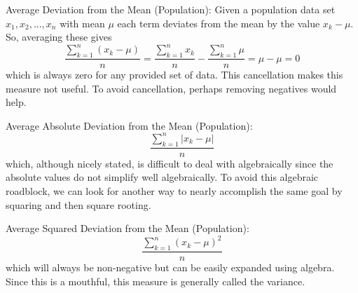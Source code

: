 \documentclass[10pt,]{book}
\theoremstyle{plain}
\theoremstyle{definition}
\theoremstyle{definition}
\theoremstyle{definition}
\numberwithin{equation}{section}
\begin{document}
Average Deviation from the Mean (Population):  Given a population data set \(x_1, x_2, ... , x_n\) with mean \(\mu\) each term deviates from the mean by the value \(x_k - \mu\). So, averaging these gives
\begin{equation*} \frac{\sum_{k=1}^n (x_k-\mu)}{n} = \frac{\sum_{k=1}^n x_k}{n} - \frac{\sum_{k=1}^n \mu}{n} = \mu - \mu = 0\end{equation*}
which is always zero for any provided set of data. This cancellation makes this measure not useful. To avoid cancellation, perhaps removing negatives would help.
%
\par
Average Absolute Deviation from the Mean (Population):  
\begin{equation*} \frac{\sum_{k=1}^n \left | x_k-\mu \right |}{n} \end{equation*}
which, although nicely stated, is difficult to deal with algebraically since the absolute values do not simplify well algebraically. To avoid this algebraic roadblock, we can look for another way to nearly accomplish the same goal by squaring and then square rooting. 
%
\par
Average Squared Deviation from the Mean (Population):
\begin{equation*} \frac{\sum_{k=1}^n ( x_k-\mu )^2}{n} \end{equation*}
which will always be non-negative but can be easily expanded using algebra. Since this is a mouthful, this measure is generally called the variance. 
%
\par
\end{document}
